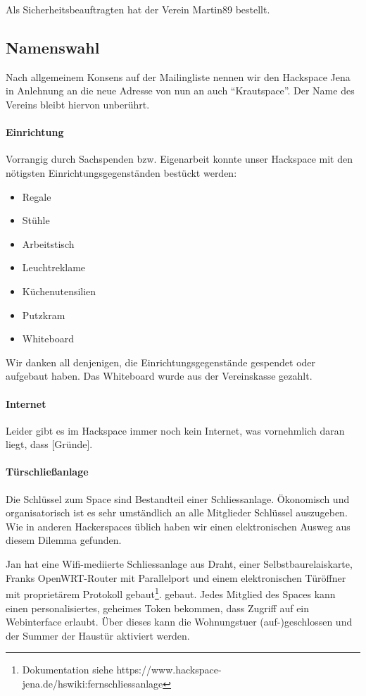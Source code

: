 \documentclass[10pt,DIV16]{scrartcl}
\begin{document}
Als Sicherheitsbeauftragten hat der Verein Martin89 bestellt.

\subsection{Namenswahl}

Nach allgemeinem Konsens auf der Mailingliste nennen wir den Hackspace Jena in
Anlehnung an die neue Adresse von nun an auch "`Krautspace"'.  Der Name des
Vereins bleibt hiervon unberührt.

\paragraph{Einrichtung}

Vorrangig durch Sachspenden bzw. Eigenarbeit konnte unser Hackspace mit den
nötigsten Einrichtungsgegenständen bestückt werden:
\begin{itemize}
	\item Regale
	\item Stühle
	\item Arbeitstisch
	\item Leuchtreklame
	\item Küchenutensilien
	\item Putzkram
	\item Whiteboard
\end{itemize}
Wir danken all denjenigen, die Einrichtungsgegenstände gespendet oder
aufgebaut haben.  Das Whiteboard wurde aus der Vereinskasse gezahlt.

\paragraph{Internet}

Leider gibt es im Hackspace immer noch kein Internet, was vornehmlich daran
liegt, dass [Gründe].

\paragraph{Türschließanlage}

Die Schl\"ussel zum Space sind Bestandteil einer
Schliessanlage. \"Okonomisch und organisatorisch ist es sehr
umst\"andlich an alle Mitglieder Schl\"ussel auszugeben. Wie in
anderen Hackerspaces \"ublich haben wir einen elektronischen Ausweg
aus diesem Dilemma gefunden.

Jan hat eine Wifi-mediierte Schliessanlage aus Draht, einer
Selbstbaurelaiskarte, Franks OpenWRT-Router mit Parallelport und einem
elektronischen T\"ur\"offner mit propriet\"arem Protokoll
gebaut\footnote{Dokumentation siehe
  https://www.hackspace-jena.de/hswiki:fernschliessanlage}.
gebaut. Jedes Mitglied des Spaces kann einen personalisiertes,
geheimes Token bekommen, dass Zugriff auf ein Webinterface
erlaubt. \"Uber dieses kann die Wohnungstuer (auf-)geschlossen und der
Summer der Haust\"ur aktiviert werden.
\end{document}
